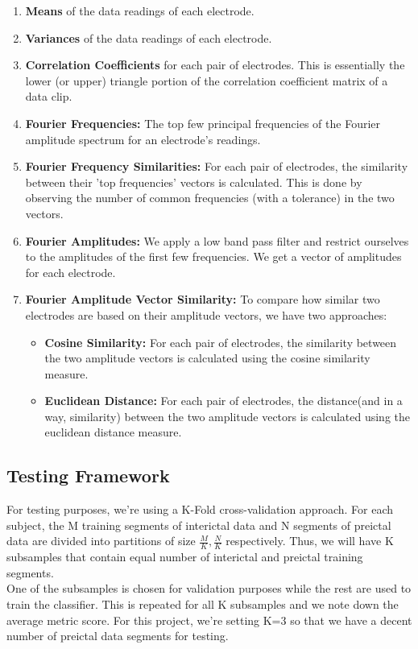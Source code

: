 \documentclass[a4paper]{article}
\begin{document}
\begin{enumerate}
\item \textbf{Means} of the data readings of each electrode.
\item \textbf{Variances} of the data readings of each electrode.
\item \textbf{Correlation Coefficients} for each pair of electrodes. This is essentially the lower (or upper) triangle portion of the correlation coefficient matrix of a data clip.
\item \textbf{Fourier Frequencies: } The top few principal frequencies of the Fourier amplitude spectrum for an electrode's readings.
\item \textbf{Fourier Frequency Similarities: } For each pair of electrodes, the similarity between their 'top frequencies' vectors is calculated. This is done by observing the number of common frequencies (with a tolerance) in the two vectors.
\item \textbf{Fourier Amplitudes: } We apply a low band pass filter and restrict ourselves to the amplitudes of the first few frequencies. We get a vector of amplitudes for each electrode.
\item \textbf{Fourier Amplitude Vector Similarity: } To compare how similar two electrodes are based on their amplitude vectors, we have two approaches:
\begin{itemize}
\item \textbf{Cosine Similarity: } For each pair of electrodes, the similarity between the two amplitude vectors is calculated using the cosine similarity measure.
\item \textbf{Euclidean Distance: } For each pair of electrodes, the distance(and in a way, similarity) between the two amplitude vectors is calculated using the euclidean distance measure.
\end{itemize}
\end{enumerate}

\subsection{Testing Framework}
For testing purposes, we're using a K-Fold cross-validation approach. For each subject, the M training segments of interictal data and N segments of preictal data are divided into partitions of size $\frac{M}{K}, \frac{N}{K}$ respectively. Thus, we will have K subsamples that contain equal number of interictal and preictal training segments. \\
One of the subsamples is chosen for validation purposes while the rest are used to train the classifier. This is repeated for all K subsamples and we note down the average metric score. For this project, we're setting K=3 so that we have a decent number of preictal data segments for testing. 
\end{document}
